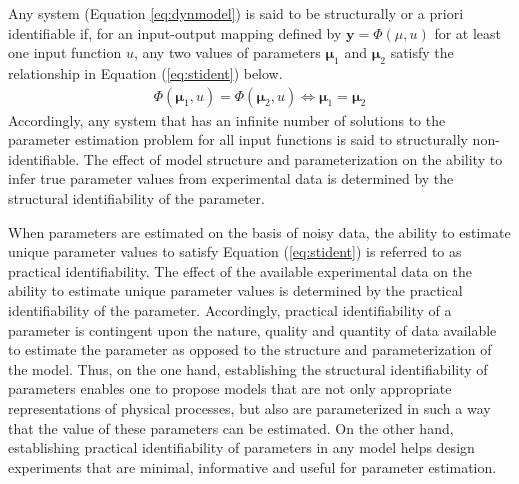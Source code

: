 \documentclass[10pt]{article}
\begin{document}
	Any system (Equation \ref{eq:dynmodel}) is said to be structurally or a priori identifiable if, for an input-output mapping defined by $\mathbf{y} = \Phi(\mu,u)$ for at least one input function $u$, any two values of parameters $\mathbf{\mu}_1$ and $\mathbf{\mu}_2$ satisfy the relationship in Equation (\ref{eq:stident}) below.
	\begin{align}\label{eq:stident}
	\Phi(\mathbf{\mu}_1,u) = \Phi(\mathbf{\mu}_2,u) \iff \mathbf{\mu}_1 = \mathbf{\mu}_2
	\end{align}
	Accordingly, any system that has an infinite number of solutions to the parameter estimation problem for all input functions is said to structurally non-identifiable. The effect of model structure and parameterization on the ability to infer true parameter values from experimental data is determined by the structural identifiability of the parameter. 
	
	When parameters are estimated on the basis of noisy data, the ability to estimate unique parameter values to satisfy Equation (\ref{eq:stident}) is referred to as practical identifiability. The effect of the available experimental data on the ability to estimate unique parameter values is determined by the practical identifiability of the parameter. Accordingly, practical identifiability of a parameter is contingent upon the nature, quality and quantity of data available to estimate the parameter as opposed to the structure and parameterization of the model. 
	Thus, on the one hand, establishing the structural identifiability of parameters enables one to propose models that are not only appropriate representations of physical processes, but also are parameterized in such a way that the value of these parameters can be estimated. On the other hand, establishing practical identifiability of parameters in any model helps design experiments that are minimal, informative and useful for parameter estimation.
	
\end{document}
